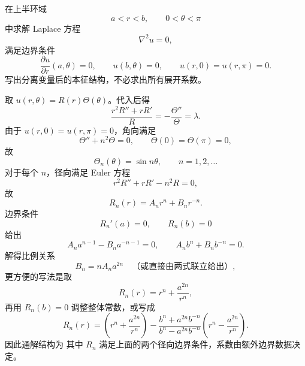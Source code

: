 \begin{question}
在上半环域
\[
 a<r<b,\qquad 0<\theta<\pi
\]
中求解 Laplace 方程
\[
\nabla^2u=0,
\]
满足边界条件
\[
\frac{\partial u}{\partial r}(a,\theta)=0,
\qquad u(b,\theta)=0,
\qquad u(r,0)=u(r,\pi)=0.
\]
写出分离变量后的本征结构，不必求出所有展开系数。
\begin{solution}

取 $u(r,\theta)=R(r)\Theta(\theta)$。代入后得
\[
\frac{r^2R''+rR'}{R}=-\frac{\Theta''}{\Theta}=\lambda.
\]
由于 $u(r,0)=u(r,\pi)=0$，角向满足
\[
\Theta''+n^2\Theta=0,
\qquad \Theta(0)=\Theta(\pi)=0,
\]
故
\[
\Theta_n(\theta)=\sin n\theta,
\qquad n=1,2,\dots
\]
对于每个 $n$，径向满足 Euler 方程
\[
r^2R''+rR'-n^2R=0,
\]
故
\[
R_n(r)=A_n r^n+B_n r^{-n}.
\]
边界条件
\[
R_n'(a)=0,
\qquad R_n(b)=0
\]
给出
\[
A_n a^{n-1}-B_n a^{-n-1}=0,
\qquad A_n b^n+B_n b^{-n}=0.
\]
解得比例关系
\[
B_n=nA_n a^{2n}
\quad\text{（或直接由两式联立给出）},
\]
更方便的写法是取
\[
R_n(r)=r^n+\frac{a^{2n}}{r^n},
\]
再用 $R_n(b)=0$ 调整整体常数，或写成
\[
R_n(r)=\left(r^n+\frac{a^{2n}}{r^n}\right)-\frac{b^n+a^{2n}b^{-n}}{b^n-a^{2n}b^{-n}}\left(r^n-\frac{a^{2n}}{r^n}\right).
\]
因此通解结构为
其中 $R_n$ 满足上面的两个径向边界条件，系数由额外边界数据决定。
\end{solution}
\end{question}


